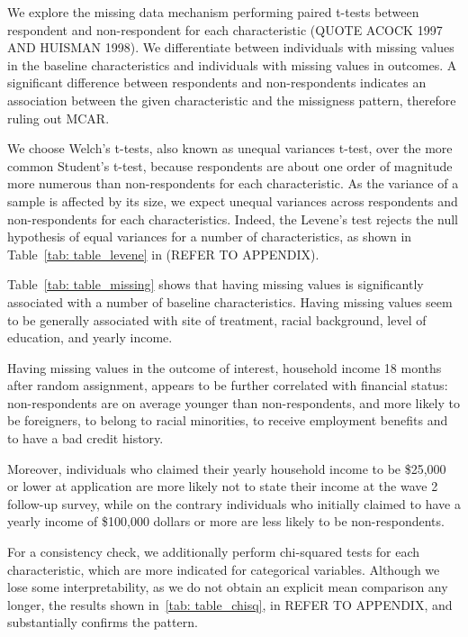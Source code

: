 We explore the missing data mechanism performing paired t-tests between respondent and non-respondent for each characteristic (QUOTE ACOCK 1997 AND HUISMAN 1998). We differentiate between individuals with missing values in the baseline characteristics and individuals with missing values in outcomes. A significant difference between respondents and non-respondents indicates an association between the given characteristic and the missigness pattern, therefore ruling out MCAR.

We choose Welch's t-tests, also known as unequal variances t-test, over the more common Student's t-test, because respondents are about one order of magnitude more numerous than non-respondents for each characteristic. As the variance of a sample is affected by its size, we expect unequal variances across respondents and non-respondents for each characteristics. Indeed, the Levene's test rejects the null hypothesis of equal variances for a number of characteristics, as shown in Table~\ref{tab: table_levene} in (REFER TO APPENDIX).

Table~\ref{tab: table_missing} shows that having missing values is significantly associated with a number of baseline characteristics. Having missing values seem to be generally associated with site of treatment, racial background, level of education, and yearly income.

Having missing values in the outcome of interest, household income 18 months after random assignment, appears to be further correlated with financial status: non-respondents are on average younger than non-respondents, and more likely to be foreigners, to belong to racial minorities, to receive employment benefits and to have a bad credit history.

Moreover, individuals who claimed their yearly household income to be \$25,000 or lower at application are more likely not to state their income at the wave 2 follow-up survey, while on the contrary individuals who initially claimed to have a yearly income of \$100,000 dollars or more are less likely to be non-respondents.

For a consistency check, we additionally perform chi-squared tests for each characteristic, which are more indicated for categorical variables. Although we lose some interpretability, as we do not obtain an explicit mean comparison any longer, the results shown in~\ref{tab: table_chisq}, in REFER TO APPENDIX, and substantially confirms the pattern.

